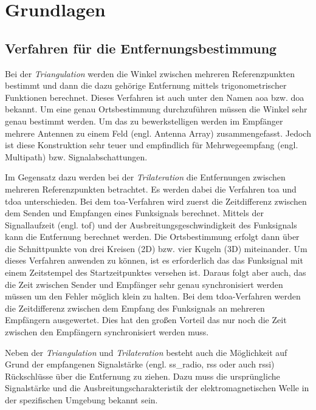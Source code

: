 %
%
%
\chapter{Grundlagen}


%
%
\section{Verfahren für die Entfernungsbestimmung}

Bei der \textit{Triangulation} werden die Winkel zwischen mehreren Referenzpunkten bestimmt und dann die dazu gehörige Entfernung mittels trigonometrischer Funktionen berechnet. Dieses Verfahren ist auch unter den Namen \Gls{aoa} bzw. \Gls{doa} bekannt. Um eine genau Ortsbestimmung durchzuführen müssen die Winkel sehr genau bestimmt werden. Um das zu bewerkstelligen werden im Empfänger mehrere Antennen zu einem Feld (engl. Antenna Array) zusammengefasst. Jedoch ist diese Konstruktion sehr teuer und empfindlich für Mehrwegeempfang (engl. Multipath) bzw. Signalabschattungen. \cite{gezici2005localization, liu2007survey, decawave2014rtls}

Im Gegensatz dazu werden bei der \textit{Trilateration} die Entfernungen zwischen mehreren Referenzpunkten betrachtet. Es werden dabei die Verfahren \Gls{toa} und \Gls{tdoa} unterschieden.
Bei dem \Gls{toa}-Verfahren wird zuerst die Zeitdifferenz zwischen dem Senden und Empfangen eines Funksignals berechnet. Mittels der Signallaufzeit (engl. \acrfull{tof}) und der Ausbreitungsgeschwindigkeit des Funksignals kann die Entfernung berechnet werden. Die Ortsbestimmung erfolgt dann über die Schnittpunkte von drei Kreisen (2D) bzw. vier Kugeln (3D) miteinander. Um dieses Verfahren anwenden zu können, ist es erforderlich das das Funksignal mit einem Zeitstempel des Startzeitpunktes versehen ist. Daraus folgt aber auch, das die Zeit zwischen Sender und Empfänger sehr genau synchronisiert werden müssen um den Fehler möglich klein zu halten.
Bei dem \Gls{tdoa}-Verfahren werden die Zeitdifferenz zwischen dem Empfang des Funksignals an mehreren Empfängern ausgewertet. Dies hat den großen Vorteil das nur noch die Zeit zwischen den Empfängern synchronisiert werden muss. \cite{zekavat2011handbook, decawave2014rtls}

Neben der \textit{Triangulation} und \textit{Trilateration} besteht auch die Möglichkeit auf Grund der empfangenen Signalstärke (engl. \acrfull{ss_radio}, \acrfull{rss} oder auch \acrfull{rssi}) Rückschlüsse über die Entfernung zu ziehen. Dazu muss die ursprüngliche Signalstärke und die Ausbreitungscharakteristik der elektromagnetischen Welle in der spezifischen Umgebung bekannt sein. \cite{gezici2005localization, decawave2014rtls}

